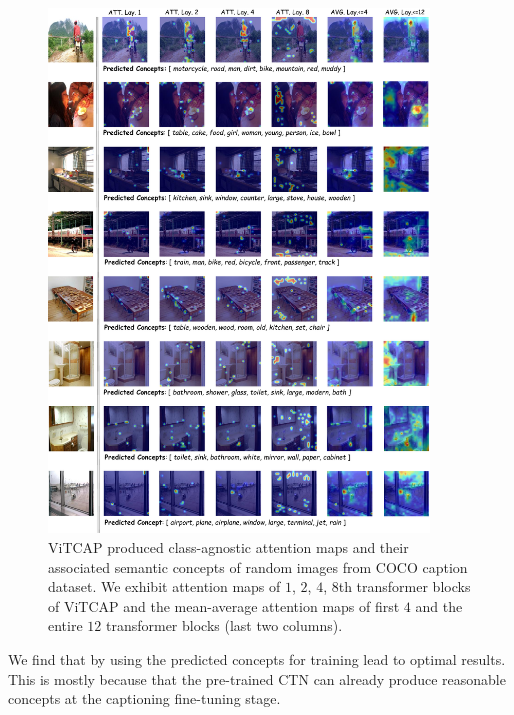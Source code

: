 \begin{figure}[h!]
  \begin{center}
    \includegraphics[width=0.9\textwidth]{./images/vitcap_qualitative.pdf}
    \vspace{-6mm}
  \end{center}
    \caption[ViTCAP produced class-agnostic attention maps and their associated semantic concepts of random images from COCO caption dataset. ]{\small ViTCAP produced class-agnostic attention maps and their associated semantic concepts of random images from COCO caption dataset. We exhibit attention maps of $1$, $2$, $4$, $8$th transformer blocks of ViTCAP and the mean-average attention maps of first $4$ and the entire $12$ transformer blocks (last two columns).
    }
  \label{fig:qualitative}
\end{figure}

We find that by using the predicted concepts for training lead to optimal results. This is mostly because that the pre-trained CTN can already produce reasonable concepts at the captioning fine-tuning stage. 



